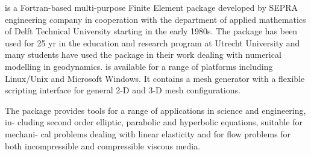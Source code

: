 \begin{itemize}
\sepran \cite{sepr05} is a Fortran-based
multi-purpose Finite Element package developed by SEPRA engineering company in
cooperation with the department of applied mathematics of Delft Technical University
starting in the early 1980s. The package has been used for 25 yr in the education and
research program at Utrecht University and many students have used the package in
their work dealing with numerical modelling in geodynamics. \sepran is available for
a range of platforms including Linux/Unix and Microsoft Windows. It contains a mesh
generator with a flexible scripting interface for general 2-D and 3-D mesh configurations.

The package provides tools for a range of applications in science and engineering, in-
cluding second order elliptic, parabolic and hyperbolic equations, suitable for mechani-
cal problems dealing with linear elasticity and for flow problems for both incompressible
and compressible viscous media.


\end{itemize}
